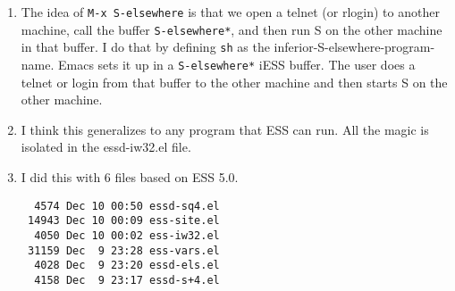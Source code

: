 \documentclass[12pt]{article}         %
\newcommand{\tty}[1]{{\tt #1}}
\begin{document}
\begin{enumerate}
\item
The idea of \tty{M-x S-elsewhere} is that we open a telnet (or rlogin) to
another machine, call the buffer \tty{*S-elsewhere*}, and
then run S on the other machine in that buffer.  I do that by defining \tty{sh}
as the inferior-S-elsewhere-program-name.  Emacs sets it up in a \tty{*S-elsewhere*}
iESS buffer.  The user does a telnet or login from that buffer to the other machine
and then starts S on the other machine.

\item
I think this generalizes to any program that ESS can run.  All the magic is isolated in
the essd-iw32.el file.

\item
I did this with 6 files based on ESS 5.0.
\begin{verbatim}
  4574 Dec 10 00:50 essd-sq4.el
 14943 Dec 10 00:09 ess-site.el
  4050 Dec 10 00:02 ess-iw32.el
 31159 Dec  9 23:28 ess-vars.el
  4028 Dec  9 23:20 essd-els.el
  4158 Dec  9 23:17 essd-s+4.el
\end{verbatim}
\end{enumerate}
\end{document}

